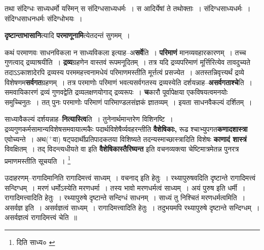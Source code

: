 \documentclass[article,12pt,a4paper]{memoir}
\newcommand{\add}[1]{($^{+}$#1)}
\begin{document}
	  \endgroup
	 

	  \pstart तथा संदिग्धः साध्यधर्मो यस्मिन् स संदिग्धसाध्यधर्मः । स आदिर्येषां ते तथोक्ताः । संदिग्धसाध्यधर्मः । संदिग्धसाधनधर्मः संदिग्धोभयः ।
	\pend
      
	  \endgroup
	

	  \pstart \textbf{दृष्टान्ताभासानि}त्यादि \textbf{परमाणूनामि}त्येतदन्तं सुगमम् ।
	\pend
      

	  \pstart कथं परमाणवः साधनविकला न साध्यविकला इत्याह--अ\textbf{सर्वे}ति । \textbf{परिमाणं} मानव्यवहारकारणम् । तच्च गुणत्वाद् द्रव्याश्रयीति । \textbf{द्रव्य}ग्रहणेन वास्तवं रूपमनूदितम् । तत्र यदि द्रव्यपरिमाणं मूर्त्तिरित्येव तावदुच्यते तदाऽऽकाशादेरपि द्रव्यस्य परममहत्त्वनामधेयं परिमाणमस्तीति मूर्त्तत्वं प्रसज्येत । अतस्तन्निवृत्त्यर्थं द्रव्ये विशेषणम\textbf{सर्वगत}ग्रहणम् । तत्र परमाणोः परिमाणं भवत्यसर्वगतस्य द्रव्यस्येति दर्शयन्नाह--\textbf{असर्वगताश्चे}ति । समवायिकारणं द्रव्यं गुणवद्वेति द्रव्यलक्षणयोगाद् द्रव्यरूपः । \textbf{च}कारौ पूर्वापेक्षया एकविषयत्वमनयोः समुच्चिनुतः । तत् पुनः परमाणोः परिमाणं पारिमाण्डलसंज्ञकं ज्ञातव्यम् । इयता साधनवैकल्यं दर्शितम् ।
	\pend
      

	  \pstart साध्यावैकल्यं दर्शयन्नाह--\textbf{नित्यास्त्वि}ति । तुनेनार्थमान्तरेण  विशिनष्टि । द्रव्यगुणकर्मसामान्यविशेषसमवायात्मकैः पदार्थविशेषैर्व्यवहरन्तीति \textbf{वैशेषिकाः,} रूढ श्चाभ्युपगत\textbf{कणादशास्त्रा} एवोच्यन्ते । अथ\add{वा} षट्पदार्थीप्रतिपादकतया विशिष्यते तदन्यस्माच्छास्त्रादिति विशेषः \textbf{काणादं शास्त्रं} विवक्षितम् । तद् विदन्त्यधीयते वा इति \textbf{वैशेषिकास्तैरिष्यन्त} इति वचनव्यक्त्या चेष्टिमात्रमेतन्न पुनरत्र प्रमाणमस्तीति सूचयति ।
	\pend
      \footnote{दिति साध्य० \cite{dp-msB} \cite{dp-edP} \cite{dp-edH} \cite{dp-edE} \cite{dp-edN}}
	  \bigskip
	  \begingroup
	

	  \pstart उदाहरणम्--रागादिमानिति रागादिमत्त्वं साध्यम् । वचनाद् इति हेतुः । रथ्यापुरुषवदिति दृष्टान्ते रागादिमत्त्वं सन्दिग्धम् । मरणं धर्मोऽस्येति मरणधर्मा । तस्य भावो मरणधर्मत्वं साध्यम् । अयं पुरुष इति धर्मी । रागादिमत्त्वादिति हेतुः । रथ्यापुरुषे दृष्टान्ते सन्दिग्धं साधनम् । साध्यं तु निश्चितं मरणधर्मत्वमिति । असर्वज्ञ इति । असर्वज्ञत्वं साध्यम् । रागादिमत्त्वादिति हेतुः । तदुभयमपि रथ्यापुरुषे दृष्टान्ते सन्दिग्धम् । असर्वज्ञत्वं रागादिमत्त्वं चेति ॥
	\pend
        
\end{document}
